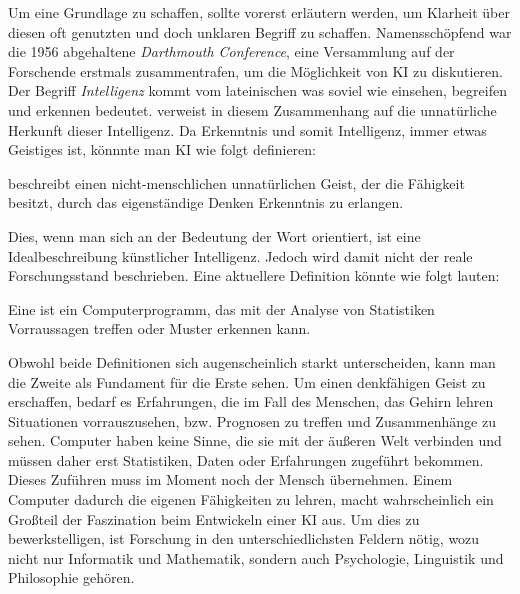 \documentclass[12pt,german,ngerman]{report}
\begin{document}
        Um eine Grundlage zu schaffen, sollte vorerst 
        erläutern werden, um Klarheit über diesen oft genutzten und doch unklaren Begriff zu schaffen.
        Namensschöpfend war die 1956 abgehaltene \emph{Darthmouth Conference}\cite[57]{buchanan2005very}, 
        eine Versammlung auf der 
        Forschende erstmals zusammentrafen, um die Möglichkeit von KI zu diskutieren.
        Der Begriff \emph{Intelligenz} kommt vom lateinischen  was soviel wie
        einsehen, begreifen und erkennen bedeutet.\cite{piaget2000psychologie}
         verweist in diesem Zusammenhang auf die unnatürliche Herkunft dieser Intelligenz.
    Da Erkenntnis und somit Intelligenz, immer etwas Geistiges ist\cite{duden2021erkenntnis}, könnnte
    man KI wie folgt definieren:
    \begin{displayquote}
         beschreibt einen nicht-menschlichen
        unnatürlichen Geist, der die Fähigkeit besitzt, 
        durch das eigenständige Denken Erkenntnis zu erlangen.
    \end{displayquote}
    Dies, wenn man sich an der Bedeutung der Wort orientiert, ist eine Idealbeschreibung künstlicher Intelligenz.
    Jedoch wird damit nicht der reale Forschungsstand beschrieben.
    Eine aktuellere Definition könnte wie folgt lauten:
    \begin{displayquote}
        Eine  ist ein Computerprogramm, das 
        mit der Analyse von Statistiken Vorraussagen treffen oder Muster erkennen kann.
    \end{displayquote}
    Obwohl beide Definitionen sich augenscheinlich starkt unterscheiden, kann man die Zweite als Fundament für
    die Erste sehen. Um einen denkfähigen Geist zu erschaffen, bedarf es Erfahrungen, die im Fall des Menschen,
    das Gehirn lehren Situationen vorrauszusehen, bzw. Prognosen zu treffen und Zusammenhänge zu sehen.
    Computer haben keine Sinne, die sie mit der äußeren Welt verbinden und 
    müssen daher erst Statistiken, Daten oder Erfahrungen zugeführt bekommen.
    Dieses Zuführen muss im Moment noch der Mensch übernehmen.
    Einem Computer dadurch die eigenen Fähigkeiten zu lehren, macht wahrscheinlich ein Großteil der Faszination
    beim Entwickeln einer KI aus. Um dies zu bewerkstelligen, ist Forschung in den unterschiedlichsten Feldern nötig,
    wozu nicht nur Informatik und Mathematik, sondern auch Psychologie, Linguistik und Philosophie\cite{buchanan2005very} gehören.\\
\end{document}

